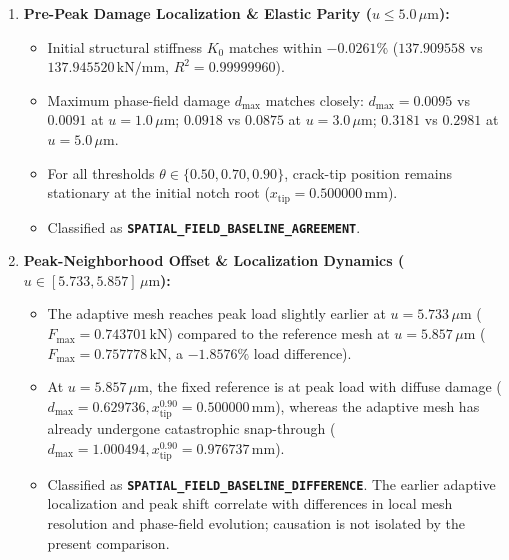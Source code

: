 \begin{enumerate}
    \item \textbf{Pre-Peak Damage Localization \& Elastic Parity ($u \le 5.0\,\mu\mathrm{m}$):}
    \begin{itemize}
        \item Initial structural stiffness $K_0$ matches within $\mathbf{-0.0261\%}$ ($137.909558$ vs $137.945520\,\mathrm{kN/mm}$, $R^2 = 0.99999960$).
        \item Maximum phase-field damage $d_{\max}$ matches closely: $d_{\max} = 0.0095$ vs $0.0091$ at $u=1.0\,\mu\mathrm{m}$; $0.0918$ vs $0.0875$ at $u=3.0\,\mu\mathrm{m}$; $0.3181$ vs $0.2981$ at $u=5.0\,\mu\mathrm{m}$.
        \item For all thresholds $\theta \in \{0.50, 0.70, 0.90\}$, crack-tip position remains stationary at the initial notch root ($x_{\mathrm{tip}} = 0.500000\,\mathrm{mm}$).
        \item Classified as \textbf{\texttt{SPATIAL\_FIELD\_BASELINE\_AGREEMENT}}.
    \end{itemize}

    \item \textbf{Peak-Neighborhood Offset \& Localization Dynamics ($u \in [5.733, 5.857]\,\mu\mathrm{m}$):}
    \begin{itemize}
        \item The adaptive mesh reaches peak load slightly earlier at $u = 5.733\,\mu\mathrm{m}$ ($F_{\max} = 0.743701\,\mathrm{kN}$) compared to the reference mesh at $u = 5.857\,\mu\mathrm{m}$ ($F_{\max} = 0.757778\,\mathrm{kN}$, a $-1.8576\%$ load difference).
        \item At $u=5.857\,\mu\mathrm{m}$, the fixed reference is at peak load with diffuse damage ($d_{\max} = 0.629736, x_{\mathrm{tip}}^{0.90} = 0.500000\,\mathrm{mm}$), whereas the adaptive mesh has already undergone catastrophic snap-through ($d_{\max} = 1.000494, x_{\mathrm{tip}}^{0.90} = 0.976737\,\mathrm{mm}$).
        \item Classified as \textbf{\texttt{SPATIAL\_FIELD\_BASELINE\_DIFFERENCE}}. The earlier adaptive localization and peak shift correlate with differences in local mesh resolution and phase-field evolution; causation is not isolated by the present comparison.
    \end{itemize}


\end{enumerate}
